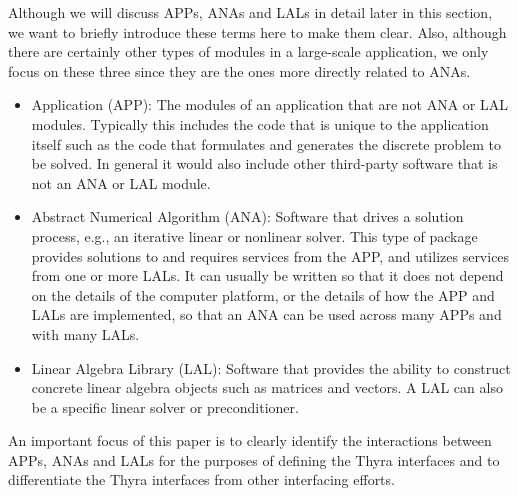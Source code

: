 \documentclass[pdf,ps2pdf,11pt]{SANDreport}
\begin{document}
Although we will discuss APPs, ANAs and LALs in detail later in this section,
we want to briefly introduce these terms here to make them clear.  Also,
although there are certainly other types of modules in a large-scale
application, we only focus on these three since they are the ones more
directly related to ANAs.
%
\begin{itemize}
%
{}\item Application (APP): The modules of an application that are not ANA or
LAL modules.  Typically this includes the code that is unique to the
application itself such as the code that formulates and generates the discrete
problem to be solved.  In general it would also include other third-party
software that is not an ANA or LAL module.
%
{}\item Abstract Numerical Algorithm (ANA): Software that drives a solution
process, e.g., an iterative linear or nonlinear solver.  This type of package
provides solutions to and requires services from the APP, and utilizes
services from one or more LALs.  It can usually be written so that it does not
depend on the details of the computer platform, or the details of how the APP
and LALs are implemented, so that an ANA can be used across many APPs and with
many LALs.
%
{}\item Linear Algebra Library (LAL): Software that provides the ability to
construct concrete linear algebra objects such as matrices and vectors.  A LAL
can also be a specific linear solver or preconditioner.
%
\end{itemize}

An important focus of this paper is to clearly identify the interactions
between APPs, ANAs and LALs for the purposes of defining the Thyra interfaces
and to differentiate the Thyra interfaces from other interfacing efforts.
\end{document}
